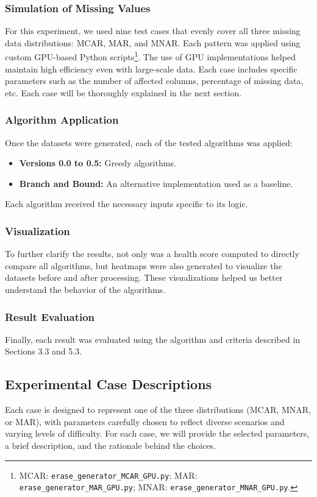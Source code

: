 \documentclass[a4paper,12pt]{article}
\begin{document}
\subsubsection{Simulation of Missing Values}
For this experiment, we used nine test cases that evenly cover all three missing data distributions: MCAR, MAR, and MNAR. Each pattern was applied using custom GPU-based Python scripts\footnote{MCAR: \texttt{erase\_generator\_MCAR\_GPU.py}; MAR: \texttt{erase\_generator\_MAR\_GPU.py}; MNAR: \texttt{erase\_generator\_MNAR\_GPU.py}.}. The use of GPU implementations helped maintain high efficiency even with large-scale data. Each case includes specific parameters such as the number of affected columns, percentage of missing data, etc. Each case will be thoroughly explained in the next section.
\subsubsection{Algorithm Application}
Once the datasets were generated, each of the tested algorithms was applied:
\begin{itemize}
    \item \textbf{Versions 0.0 to 0.5:} Greedy algorithms.
    \item \textbf{Branch and Bound:} An alternative implementation used as a baseline.
\end{itemize}
Each algorithm received the necessary inputs specific to its logic.

\subsubsection{Visualization}
To further clarify the results, not only was a health score computed to directly compare all algorithms, but heatmaps were also generated to visualize the datasets before and after processing. These visualizations helped us better understand the behavior of the algorithms.

\subsubsection{Result Evaluation}
Finally, each result was evaluated using the algorithm and criteria described in Sections 3.3 and 5.3.

\subsection{Experimental Case Descriptions}
Each case is designed to represent one of the three distributions (MCAR, MNAR, or MAR), with parameters carefully chosen to reflect diverse scenarios and varying levels of difficulty. For each case, we will provide the selected parameters, a brief description, and the rationale behind the choices. 
\end{document}
